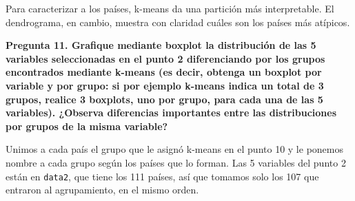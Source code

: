 \documentclass[
]{article}
\newenvironment{Shaded}{\begin{snugshade}}{\end{snugshade}}
\newcommand{\AttributeTok}[1]{\textcolor[rgb]{0.13,0.29,0.53}{#1}}
\newcommand{\CommentTok}[1]{\textcolor[rgb]{0.56,0.35,0.01}{\textit{#1}}}
\newcommand{\DecValTok}[1]{\textcolor[rgb]{0.00,0.00,0.81}{#1}}
\newcommand{\FunctionTok}[1]{\textcolor[rgb]{0.13,0.29,0.53}{\textbf{#1}}}
\newcommand{\NormalTok}[1]{#1}
\newcommand{\OtherTok}[1]{\textcolor[rgb]{0.56,0.35,0.01}{#1}}
\newcommand{\SpecialCharTok}[1]{\textcolor[rgb]{0.81,0.36,0.00}{\textbf{#1}}}
\newcommand{\StringTok}[1]{\textcolor[rgb]{0.31,0.60,0.02}{#1}}
\begin{document}
Para caracterizar a los países, k-means da una partición más
interpretable. El dendrograma, en cambio, muestra con claridad cuáles
son los países más atípicos.

\noindent\textbf{Pregunta 11. Grafique mediante boxplot la distribución de las 5 variables seleccionadas en el punto 2 diferenciando por los grupos encontrados mediante k-means (es decir, obtenga un boxplot por variable y por grupo: si por ejemplo k-means indica un total de 3 grupos, realice 3 boxplots, uno por grupo, para cada una de las 5 variables). ¿Observa diferencias importantes entre las distribuciones por grupos de la misma variable?}

Unimos a cada país el grupo que le asignó k-means en el punto 10 y le
ponemos nombre a cada grupo según los países que lo forman. Las 5
variables del punto 2 están en \texttt{data2}, que tiene los 111 países,
así que tomamos solo los 107 que entraron al agrupamiento, en el mismo
orden.

\begin{Shaded}
\end{Shaded}
\end{document}
